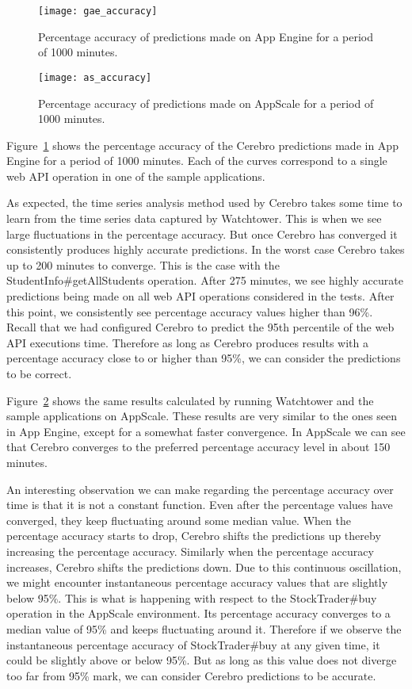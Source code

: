 \begin{figure}
\centering
\texttt{[image: gae\_accuracy]}
\caption{Percentage accuracy of predictions made on App Engine for a period of 1000 minutes.}
\label{fig:gae_accuracy}
\end{figure}

\begin{figure}
\centering
\texttt{[image: as\_accuracy]}
\caption{Percentage accuracy of predictions made on AppScale for a period of 1000 minutes.}
\label{fig:as_accuracy}
\end{figure}

Figure~\ref{fig:gae_accuracy} shows the percentage accuracy of the Cerebro predictions made in App Engine 
for a period of 1000 minutes. Each of the curves correspond to a single web API operation in one of the 
sample applications. 

As expected, the time series analysis method used by Cerebro takes some time to learn
from the time series data captured by Watchtower. This is when we see large fluctuations in the percentage accuracy. But
once Cerebro has converged it consistently produces highly accurate predictions.
In the worst case Cerebro takes up to 200 minutes to converge. This is the case with the
StudentInfo\#getAllStudents operation. After 275 minutes, we see highly accurate predictions being made on all web API
operations considered in the tests. After this point, we consistently see percentage accuracy values higher than 96\%. Recall that
we had configured Cerebro to predict the 95th percentile of the web API executions time. Therefore as long as Cerebro produces
results with a percentage accuracy close to or higher than 95\%, we can consider the predictions to be correct.

Figure~\ref{fig:as_accuracy} shows the same results calculated by running Watchtower and the sample applications on AppScale.
These results are very similar to the ones seen in App Engine, except for a somewhat faster convergence. In AppScale
we can see that Cerebro converges to the preferred percentage accuracy level in about 150 minutes.

An interesting observation we can make regarding the percentage accuracy over time is that it is not a constant function. 
Even after the percentage values have converged, they keep fluctuating 
around some median value. When the percentage accuracy starts to drop, Cerebro shifts the predictions up thereby increasing
the percentage accuracy. Similarly when the percentage accuracy increases, Cerebro shifts the predictions down. Due to this
continuous oscillation, we might encounter instantaneous percentage accuracy values that are slightly 
below 95\%. This is what is
happening with respect to the StockTrader\#buy operation in the AppScale environment. Its percentage accuracy converges to a median
value of 95\% and keeps fluctuating around it. Therefore if we observe the instantaneous percentage accuracy of 
StockTrader\#buy at any given time, it
could be slightly above or below 95\%. 
But as long as this value does not diverge too far from 95\% mark, we can consider Cerebro predictions to
be accurate.


